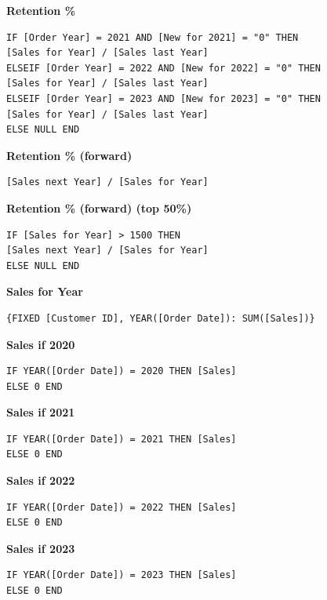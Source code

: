 \documentclass[12pt,a4paper]{article}
\begin{document}
\textbf{Retention \%}
\begin{lstlisting}[style=customstyle]
IF [Order Year] = 2021 AND [New for 2021] = "0" THEN
[Sales for Year] / [Sales last Year]
ELSEIF [Order Year] = 2022 AND [New for 2022] = "0" THEN
[Sales for Year] / [Sales last Year]
ELSEIF [Order Year] = 2023 AND [New for 2023] = "0" THEN
[Sales for Year] / [Sales last Year]
ELSE NULL END
\end{lstlisting}
\vspace*{1cm}

\textbf{Retention \% (forward)}
\begin{lstlisting}[style=customstyle]
[Sales next Year] / [Sales for Year]
\end{lstlisting}
\vspace*{1cm}

\textbf{Retention \% (forward) (top 50\%)}
\begin{lstlisting}[style=customstyle]
IF [Sales for Year] > 1500 THEN
[Sales next Year] / [Sales for Year]
ELSE NULL END
\end{lstlisting}
\vspace*{1cm}

\textbf{Sales for Year}
\begin{lstlisting}[style=customstyle]
{FIXED [Customer ID], YEAR([Order Date]): SUM([Sales])}
\end{lstlisting}
\vspace*{1cm}

\textbf{Sales if 2020}
\begin{lstlisting}[style=customstyle]
IF YEAR([Order Date]) = 2020 THEN [Sales]
ELSE 0 END
\end{lstlisting}
\vspace*{1cm}

\textbf{Sales if 2021}
\begin{lstlisting}[style=customstyle]
IF YEAR([Order Date]) = 2021 THEN [Sales]
ELSE 0 END
\end{lstlisting}
\vspace*{1cm}

\textbf{Sales if 2022}
\begin{lstlisting}[style=customstyle]
IF YEAR([Order Date]) = 2022 THEN [Sales]
ELSE 0 END
\end{lstlisting}
\vspace*{1cm}

\textbf{Sales if 2023}
\begin{lstlisting}[style=customstyle]
IF YEAR([Order Date]) = 2023 THEN [Sales]
ELSE 0 END
\end{lstlisting}
\vspace*{1cm}
\end{document}
